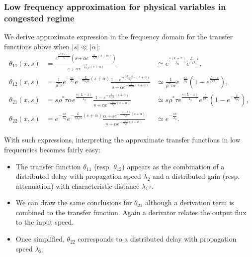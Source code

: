 \documentclass[preprint]{elsarticle}
\begin{document}
\subsubsection{Low frequency approximation for physical variables in congested regime}
We derive approximate expression in the frequency domain for the transfer functions above when $\left|s\right|\ll\left|\alpha\right|$:
\begin{subequations}
\begin{align}
\theta_{11}\left(x,s\right) &=
\frac{
	e^{\frac{s\left(L-x\right)}{\lambda_{2}}}
	\left(
		s
		+
		\alpha
		e^{
			-\frac{x}{\tau\lambda_{1}\alpha}
			\left(s+\alpha\right)
		}
	\right)
}{
	s
	+
	\alpha
	e^{
		-\frac{L}{\tau\lambda_{1}\alpha}
		\left(s+\alpha\right)
	}
}
&\simeq
e^{\frac{s\left(L-x\right)}{\lambda_{2}}}
e^{\frac{L-x}{\tau\lambda_{1}}},\\
\theta_{12}\left(x,s\right) &=
\frac{1}{\rho^{*}\tau}
e^{-\frac{sx}{\lambda_{2}}}
e^{-\frac{L}{\tau\lambda_{1}\alpha}\left(s+\alpha\right)}
\frac{
	1 - e^{-\frac{\left(x-L\right)}{\tau\lambda_{1}\alpha}\left(s+\alpha\right)}
}{
	s
	+
	\alpha
	e^{
		-\frac{L}{\tau\lambda_{1}\alpha}
		\left(s+\alpha\right)
	}
}
&\simeq
\frac{1}{\rho^{*}\tau\alpha}
e^{-\frac{sx}{\lambda_{2}}}
\left(
	1 - e^{\frac{L-x}{\tau\lambda_{1}}}
\right),\\
\theta_{21}\left(x,s\right) &=
s \rho^{*}\tau\alpha
e^{\frac{s\left(L-x\right)}{\lambda_{2}}}
\frac{
	1 - 
	e^{-\frac{x}{\tau\lambda_{1}\alpha}\left(s+\alpha\right)}
}{
	s
	+
	\alpha
	e^{
		-\frac{L}{\tau\lambda_{1}\alpha}
		\left(s+\alpha\right)
	}
}
&\simeq
s \rho^{*}\tau
e^{\frac{s\left(L-x\right)}{\lambda_{2}}}
e^{\frac{L}{\tau\lambda_{1}}}
\left(
	1 - e^{-\frac{x}{\tau\lambda_{1}}}
\right),\\
\theta_{22}\left(x,s\right) &=
e^{-\frac{sx}{\lambda_{2}}}
e^{-\frac{L}{\tau\lambda_{1}\alpha}\left(s+\alpha\right)}
\frac{
	\alpha + se^{-\frac{\left(x-L\right)}{\tau\lambda_{1}\alpha}\left(s+\alpha\right)}
}{
	s
	+
	\alpha
	e^{
		-\frac{L}{\tau\lambda_{1}\alpha}
		\left(s+\alpha\right)
	}
}
&\simeq
e^{-\frac{sx}{\lambda_{2}}}.
\end{align}
\end{subequations}

With such expressions, interpreting the approximate transfer functions in low frequencies becomes fairly easy:
\begin{itemize}
\item The transfer function $\theta_{11}$ (resp. $\theta_{12}$) appears as the combination of a distributed delay with propagation speed $\lambda_{2}$ and a distributed gain (resp. attenuation) with characteristic distance $\lambda_{1}\tau$.
\item We can draw the same conclusions for $\theta_{21}$ although a derivation term is combined to the transfer function. Again a derivator relates the output flux to the input speed.
\item Once simplified, $\theta_{22}$ corresponds to a distributed delay with propagation speed $\lambda_{2}$.
\end{itemize}
\end{document}
